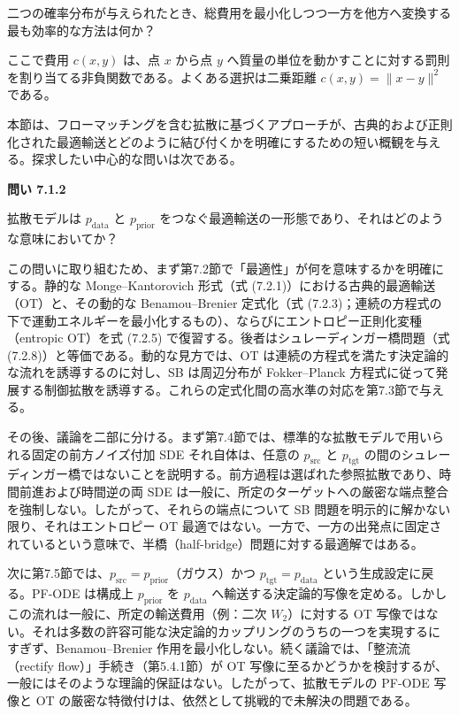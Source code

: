 \begin{propositionbox}[注意]
二つの確率分布が与えられたとき、総費用を最小化しつつ一方を他方へ変換する最も効率的な方法は何か？
\end{propositionbox}


ここで費用 $c(x,y)$ は、点 $x$ から点 $y$ へ質量の単位を動かすことに対する罰則を割り当てる非負関数である。よくある選択は二乗距離 $c(x,y)=\|x-y\|^2$ である。

本節は、フローマッチングを含む拡散に基づくアプローチが、古典的および正則化された最適輸送とどのように結び付くかを明確にするための短い概観を与える。探求したい中心的な問いは次である。

\textbf{問い 7.1.2}

\begin{propositionbox}[注意]
拡散モデルは $p_{\mathrm{data}}$ と $p_{\mathrm{prior}}$ をつなぐ最適輸送の一形態であり、それはどのような意味においてか？
\end{propositionbox}


この問いに取り組むため、まず第7.2節で「最適性」が何を意味するかを明確にする。静的な Monge–Kantorovich 形式（式 (7.2.1)）における古典的最適輸送（OT）と、その動的な Benamou–Brenier 定式化（式 (7.2.3)；連続の方程式の下で運動エネルギーを最小化するもの）、ならびにエントロピー正則化変種（entropic OT）を式 (7.2.5) で復習する。後者はシュレーディンガー橋問題（式 (7.2.8)）と等価である。動的な見方では、OT は連続の方程式を満たす決定論的な流れを誘導するのに対し、SB は周辺分布が Fokker–Planck 方程式に従って発展する制御拡散を誘導する。これらの定式化間の高水準の対応を第7.3節で与える。

その後、議論を二部に分ける。まず第7.4節では、標準的な拡散モデルで用いられる固定の前方ノイズ付加 SDE それ自体は、任意の $p_{\mathrm{src}}$ と $p_{\mathrm{tgt}}$ の間のシュレーディンガー橋ではないことを説明する。前方過程は選ばれた参照拡散であり、時間前進および時間逆の両 SDE は一般に、所定のターゲットへの厳密な端点整合を強制しない。したがって、それらの端点について SB 問題を明示的に解かない限り、それはエントロピー OT 最適ではない。一方で、一方の出発点に固定されているという意味で、半橋（half-bridge）問題に対する最適解ではある。

次に第7.5節では、$p_{\mathrm{src}}=p_{\mathrm{prior}}$（ガウス）かつ $p_{\mathrm{tgt}}=p_{\mathrm{data}}$ という生成設定に戻る。PF-ODE は構成上 $p_{\mathrm{prior}}$ を $p_{\mathrm{data}}$ へ輸送する決定論的写像を定める。しかしこの流れは一般に、所定の輸送費用（例：二次 $W_2$）に対する OT 写像ではない。それは多数の許容可能な決定論的カップリングのうちの一つを実現するにすぎず、Benamou–Brenier 作用を最小化しない。続く議論では、「整流流（rectify flow）」手続き（第5.4.1節）が OT 写像に至るかどうかを検討するが、一般にはそのような理論的保証はない。したがって、拡散モデルの PF-ODE 写像と OT の厳密な特徴付けは、依然として挑戦的で未解決の問題である。

